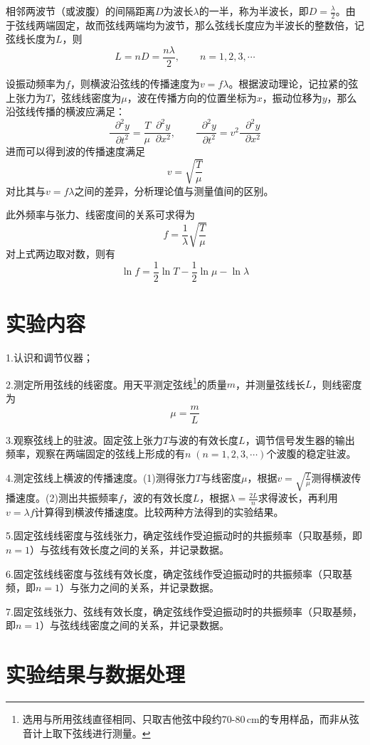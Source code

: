 \documentclass[UTF-8,twoside,cs4size]{ctexart}
\newcommand*{\mpar}{\mathop{}\!\partial}
\begin{document}
	相邻两波节（或波腹）的间隔距离$ D $为波长$ \lambda $的一半，称为半波长，即$ D=\frac\lambda2 $。由于弦线两端固定，故而弦线两端均为波节，那么弦线长度应为半波长的整数倍，记弦线长度为$ L $，则
	\[L=nD=\frac{n\lambda}{2},\qquad n=1,2,3,\cdots\]
	
	设振动频率为$ f $，则横波沿弦线的传播速度为$ v=f\lambda $。根据波动理论，记拉紧的弦上张力为$ T $，弦线线密度为$ \mu $，波在传播方向的位置坐标为$ x $，振动位移为$ y $，那么沿弦线传播的横波应满足：
	\[\frac{\mpar^2y}{\mpar t^2}=\frac{T\mpar^2y}{\mu\mpar x^2},\qquad\frac{\mpar^2y}{\mpar t^2}=v^2\frac{\mpar^2y}{\mpar x^2}\]
	进而可以得到波的传播速度满足
	\[v=\sqrt{\frac T\mu}\]
	对比其与$ v=f\lambda $之间的差异，分析理论值与测量值间的区别。
	
	此外频率与张力、线密度间的关系可求得为
	\[f=\frac1\lambda\sqrt{\frac T\mu}\]
	对上式两边取对数，则有
	\[\ln f=\frac12\ln T-\frac12\ln\mu-\ln\lambda\]
	
	\section{实验内容}
	1.认识和调节仪器；
	
	2.测定所用弦线的线密度。用天平测定弦线\footnote{选用与所用弦线直径相同、只取吉他弦中段约70-80\,cm的专用样品，而非从弦音计上取下弦线进行测量。}的质量$ m $，并测量弦线长$ L $，则线密度为
	\[\mu=\frac mL\]
	
	3.观察弦线上的驻波。固定弦上张力$ T $与波的有效长度$ L $，调节信号发生器的输出频率，观察在两端固定的弦线上形成的有$ n\;(n=1,2,3,\cdots) $个波腹的稳定驻波。
	
	4.测定弦线上横波的传播速度。(1)测得张力$ T $与线密度$ \mu $，根据$ v=\sqrt{\frac T\mu} $测得横波传播速度。(2)测出共振频率$ f $，波的有效长度$ L $，根据$ \lambda=\frac{2L}{n} $求得波长，再利用$ v=\lambda f $计算得到横波传播速度。比较两种方法得到的实验结果。
	
	5.固定弦线线密度与弦线张力，确定弦线作受迫振动时的共振频率（只取基频，即$ n=1 $）与弦线有效长度之间的关系，并记录数据。
	
	6.固定弦线线密度与弦线有效长度，确定弦线作受迫振动时的共振频率（只取基频，即$ n=1 $）与张力之间的关系，并记录数据。
	
	7.固定弦线张力、弦线有效长度，确定弦线作受迫振动时的共振频率（只取基频，即$ n=1 $）与弦线线密度之间的关系，并记录数据。
	
	\section{实验结果与数据处理}
\end{document}
